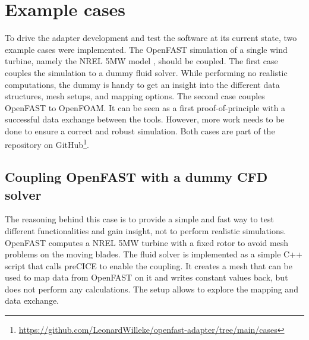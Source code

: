 \section{Example cases}
\label{section:cases}

To drive the adapter development and test the software at its current state, two example cases were implemented. The OpenFAST simulation of a single wind turbine, namely the NREL 5MW model \cite{Jonkman:2009}, should be coupled. The first case couples the simulation to a dummy fluid solver. While performing no realistic computations, the dummy is handy to get an insight into the different data structures, mesh setups, and mapping options. The second case couples OpenFAST to OpenFOAM. It can be seen as a first proof-of-principle with a successful data exchange between the tools. However, more work needs to be done to ensure a correct and robust simulation. Both cases are part of the repository on GitHub\footnote{\url{https://github.com/LeonardWilleke/openfast-adapter/tree/main/cases}}.

\subsection{Coupling OpenFAST with a dummy CFD solver}

The reasoning behind this case is to provide a simple and fast way to test different functionalities and gain insight, not to perform realistic simulations. OpenFAST computes a NREL 5MW turbine with a fixed rotor to avoid mesh problems on the moving blades. The fluid solver is implemented as a simple C++ script that calls preCICE to enable the coupling. It creates a mesh that can be used to map data from OpenFAST on it and writes constant values back, but does not perform any calculations. The setup allows to explore the mapping and data exchange.

